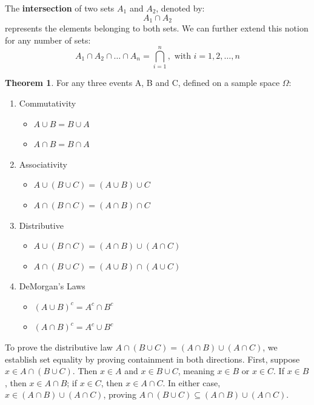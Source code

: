 \documentclass[12pt]{book}
\theoremstyle{definition}
\newtheorem{theorem}{Theorem}[section]
\begin{document}
The \textbf{intersection} of two sets $A_1$ and $A_2$, denoted by:
\[
    A_1 \cap A_2
\] represents the elements belonging to both sets. We can further extend this notion for any number of sets:
\[
    A_1 \cap A_2 \cap \dots \cap A_n = \bigcap_{i = 1}^{n}, \text{ with } i = 1, 2, \dots, n
\]

\begin{theorem}
    For any three events A, B and C, defined on a sample space $\Omega$:

    \begin{enumerate}
        \item Commutativity
        \begin{itemize}
            \item $A \cup B = B \cup A$
            \item $A \cap B = B \cap A$
        \end{itemize}

        \item Associativity
        \begin{itemize}
            \item $A \cup (B \cup C) = (A \cup B) \cup C$
            \item $A \cap (B \cap C) = (A \cap B) \cap C$
        \end{itemize}

        \item Distributive
        \begin{itemize}
            \item $A \cup (B \cap C) = (A \cap B) \cup (A \cap C)$
            \item $A \cap (B \cup C) = (A \cup B) \cap (A \cup C)$
        \end{itemize}

        \item DeMorgan's Laws
        \begin{itemize}
            \item $(A \cup B)^c = A^c \cap B^c$
            \item $(A \cap B)^c = A^c \cup B^c$
        \end{itemize}
    \end{enumerate}
\end{theorem} 

To prove the distributive law \( A \cap (B \cup C) = (A \cap B) \cup (A \cap C) \), we establish set equality by proving containment in both directions. First, suppose \( x \in A \cap (B \cup C) \). Then \( x \in A \) and \( x \in B \cup C \), meaning \( x \in B \) or \( x \in C \). If \( x \in B \), then \( x \in A \cap B \); if \( x \in C \), then \( x \in A \cap C \). In either case, \( x \in (A \cap B) \cup (A \cap C) \), proving \( A \cap (B \cup C) \subseteq (A \cap B) \cup (A \cap C) \).
\end{document}
